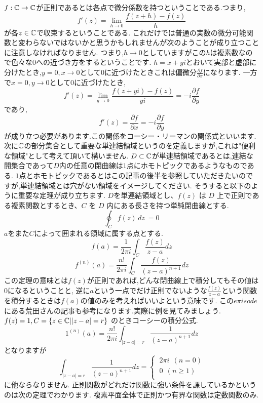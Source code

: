 $f:\mathbb C \to \mathbb C$が正則であるとは各点で微分係数を持つということである.つまり,
\[
f'(z) = \lim_{h\to 0} \frac{f(z+h) - f(z)}{h}
\]
が各$z\in\mathbb C$で収束するということである.
\rem
これだけでは普通の実数の微分可能関数と変わらないではないかと思うかもしれませんが次のようことが成り立つことに注意しなければなりません.
つまり,$h\to 0$としていますがこの$h$は複素数なので色々な$0$への近づき方をするということです.
$h=x+yi$とおいて実部と虚部に分けたとき,$y=0,x\to 0$として$0$に近づけたときこれは偏微分$\frac{\partial f}{\partial x}$になります.
一方で$x=0,y\to 0$として$0$に近づけたとき,
\[
f'(z) = \lim_{y\to 0} \frac{f(z+yi)-f(z)}{yi} = -i\frac{\partial f}{\partial y}
\]
であり,
\[
f'(z) = \frac{\partial f}{\partial x} = -i\frac{\partial f}{\partial y}
\]
が成り立つ必要があります.この関係をコーシー・リーマンの関係式といいます.
\remx
次に$\mathbb C$の部分集合として重要な単連結領域というのを定義しますが,これは"便利な領域"として考えて頂いて構いません.
$D \subset \mathbb C$が単連結領域であるとは,連結な開集合であって$D$内の任意の閉曲線は$1$点にホモトピックであるようなものである.
$1$点とホモトピックであるとはこの記事の後半を参照していただきたいのですが,単連結領域とは穴がない領域をイメージしてください.
そうすると以下のように重要な定理が成り立ちます.
\thm[コーシーの積分定理と積分公式]
$D$を単連結領域とし、$f(z)$ は $D$ 上で正則である複素関数とするとき、$C$ を $D$ 内にある長さを持つ単純閉曲線とする.
\[
 \oint_C f(z) \, dz\ = 0
\]
$a$をまた$C$によって囲まれる領域に属する点とする.
\[
 f(a) = \frac{1}{2 \pi i}\int_C \frac{f(z)}{z-a}dz
\]
\[
 f^{(n)}(a) = \frac{n!}{2 \pi i}\int_C \frac{f(z)}{(z-a)^{n+1}}dz
\]
\thmx
この定理の意味とは$f(z)$が正則であれば,どんな閉曲線上で積分してもその値は$0$になるということと,
逆に$a$という一点でだけ正則でないような$\frac{f(z)}{z-a}$という関数を積分するときは$f(a)$の値のみを考えればいいよという意味です.
この$e\pi isode$にある荒田さんの記事も参考になります.実際に例を見てみましょう.
\ex[コーシーの積分公式の例]
$f(z) = 1 , C = \{z\in\mathbb C | |z-a|=r\} $ のときコーシーの積分公式.\\
\[
1^{(n)}(a) = \frac{n!}{2 \pi i}\int_{|z-a|=r} \frac{1}{(z-a)^{n+1}} dz 
\]
となりますが
\[
 \int_{|z-a|=r} \frac{1}{(z-a)^{n+1}} dz =
  \begin{cases}
   \  2\pi i  \ \ (n=0) \\
   \  0 \ \ (n \ge 1) \\
  \end{cases}
\]
に他ならなりません.
\exx
正則関数がどれだけ関数に強い条件を課しているかというのは次の定理でわかります.
\thm[リュービルの定理]
複素平面全体で正則かつ有界な関数は定数関数のみ.
